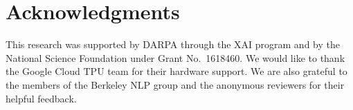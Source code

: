 \documentclass[11pt,a4paper]{article}
\begin{document}
\section*{Acknowledgments}
This research was supported by DARPA through the XAI program and by the National Science Foundation under Grant No.\ 1618460. We would like to thank the Google Cloud TPU team for their hardware support. We are also grateful to the members of the Berkeley NLP group and the anonymous reviewers for their helpful feedback.



\end{document}
